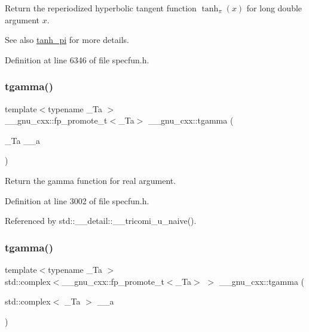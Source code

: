 Return the reperiodized hyperbolic tangent function $ \tanh_\pi(x) $ for {\ttfamily long double} argument $ x $.

\begin{DoxySeeAlso}{See also}
\hyperlink{group__gnu__math__spec__func_ga8729ffd5acf3266315e9dac1b5a9b3a6}{tanh\+\_\+pi} for more details. 
\end{DoxySeeAlso}


Definition at line 6346 of file specfun.\+h.

\mbox{\label{group__gnu__math__spec__func_ga73a634663e4eceb1e6bcf3fc16773b7b}} 
\subsubsection{\texorpdfstring{tgamma()}{tgamma()}\hspace{0.1cm}{\footnotesize\ttfamily [1/3]}}
{\footnotesize\ttfamily template$<$typename \+\_\+\+Ta $>$ \\
\+\_\+\+\_\+gnu\+\_\+cxx\+::fp\+\_\+promote\+\_\+t$<$\+\_\+\+Ta$>$ \+\_\+\+\_\+gnu\+\_\+cxx\+::tgamma (\begin{DoxyParamCaption}\item[{\+\_\+\+Ta}]{\+\_\+\+\_\+a }\end{DoxyParamCaption})\hspace{0.3cm}{\ttfamily [inline]}}

Return the gamma function for real argument. 

Definition at line 3002 of file specfun.\+h.



Referenced by std\+::\+\_\+\+\_\+detail\+::\+\_\+\+\_\+tricomi\+\_\+u\+\_\+naive().

\mbox{\label{group__gnu__math__spec__func_gab01fe5b7f1bacdafcad5746ef50af777}} 
\subsubsection{\texorpdfstring{tgamma()}{tgamma()}\hspace{0.1cm}{\footnotesize\ttfamily [2/3]}}
{\footnotesize\ttfamily template$<$typename \+\_\+\+Ta $>$ \\
std\+::complex$<$\+\_\+\+\_\+gnu\+\_\+cxx\+::fp\+\_\+promote\+\_\+t$<$\+\_\+\+Ta$>$ $>$ \+\_\+\+\_\+gnu\+\_\+cxx\+::tgamma (\begin{DoxyParamCaption}\item[{std\+::complex$<$ \+\_\+\+Ta $>$}]{\+\_\+\+\_\+a }\end{DoxyParamCaption})\hspace{0.3cm}{\ttfamily [inline]}}

